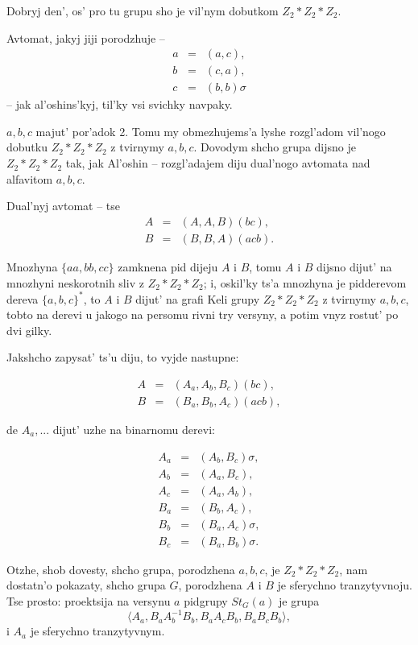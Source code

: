 \documentclass[10pt]{article}
\begin{document}
Dobryj den', os' pro tu grupu sho je vil'nym dobutkom $Z_2*Z_2*Z_2$.

Avtomat, jakyj jiji porodzhuje --
\begin{eqnarray*}
a & = & (a, c),\\
b & = & (c, a),\\
c & = & (b, b)\sigma 
\end{eqnarray*}
 -- jak al'oshins'kyj, til'ky vsi svichky navpaky.

$a, b, c$ majut' por'adok 2. Tomu my obmezhujems'a lyshe rozgl'adom vil'nogo dobutku
$Z_2*Z_2*Z_2$ z tvirnymy $a, b, c$. Dovodym shcho grupa dijsno je $Z_2*Z_2*Z_2$ tak,
jak Al'oshin -- rozgl'adajem diju dual'nogo avtomata nad alfavitom $a, b, c$.

Dual'nyj avtomat -- tse
\begin{eqnarray*}
A & = & (A, A, B)(bc),\\
B & = & (B, B, A)(acb).
\end{eqnarray*}

Mnozhyna $\{aa, bb, cc\}$ zamknena pid dijeju $A$ i $B$, tomu $A$ i $B$ dijsno
dijut' na mnozhyni neskorotnih sliv z $Z_2*Z_2*Z_2$; i, oskil'ky ts'a mnozhyna
je pidderevom dereva $\{a, b, c\}^*$, to $A$ i $B$ dijut' na grafi Keli grupy
$Z_2*Z_2*Z_2$ z tvirnymy $a, b, c$, tobto na derevi u jakogo na persomu rivni
try versyny, a potim vnyz rostut' po dvi gilky.

Jakshcho zapysat' ts'u diju, to vyjde nastupne:

\begin{eqnarray*}
A & = & (A_a, A_b, B_c)(bc),\\
B & = & (B_a, B_b, A_c)(acb),
\end{eqnarray*}

de $A_a, ...$ dijut' uzhe na binarnomu derevi:

\begin{eqnarray}
A_a & = & (A_b, B_c)\sigma,\\
A_b & = & (A_a, B_c),\\
A_c & = & (A_a, A_b),\\
B_a & = & (B_b, A_c),\\
B_b & = & (B_a, A_c)\sigma,\\
B_c & = & (B_a, B_b)\sigma.
\end{eqnarray}

Otzhe, shob dovesty, shcho grupa, porodzhena $a, b, c$, je $Z_2*Z_2*Z_2$, nam dostatn'o
pokazaty, shcho grupa $G$, porodzhena $A$ i $B$ je sferychno tranzytyvnoju. Tse prosto:
proektsija na versynu $a$ pidgrupy $St_G(a)$ je grupa
$$\langle A_a, B_aA_b^{-1}B_b, B_aA_cB_b, B_aB_cB_b\rangle, $$
i $A_a$ je sferychno tranzytyvnym.
\end{document}
